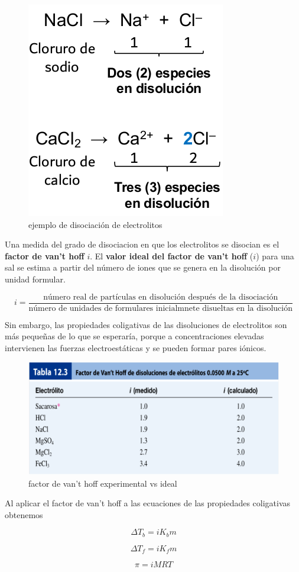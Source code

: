 \documentclass[]{article}
\begin{document}
\begin{figure}[H]
\center
\includegraphics[scale=0.3]{foto21.png}
\caption{ejemplo de disociación de electrolitos}
\end{figure}

Una medida del grado de disociacion en que los electrolitos se disocian es el \textbf{factor de van't hoff} $i$. El \textbf{valor ideal del factor de van't hoff} ($i$) para una sal se estima a partir del número de iones que se genera en la disolución por unidad formular.

\begin{equation}
i=\frac{\text{número real de partículas en disolución después de la disociación}}{\text{número de unidades de formulares inicialmnete disueltas en la disolución}}
\end{equation}

Sin embargo, las propiedades coligativas de las disoluciones de electrolitos son más pequeñas de lo que se esperaría, porque a concentraciones elevadas intervienen las fuerzas electroestáticas y se pueden formar pares iónicos.

\begin{figure}[H]
\center
\includegraphics[scale=0.3]{foto22.png}
\caption{factor de van't hoff experimental vs ideal}
\end{figure}

Al aplicar el factor de van't hoff a las ecuaciones de las propiedades coligativas obtenemos

\begin{equation}
\Delta T_{b}=iK_{b}m
\end{equation}

\begin{equation}
\Delta T_{f}=iK_{f}m
\end{equation}

\begin{equation}
\pi = iMRT
\end{equation}
\end{document}
